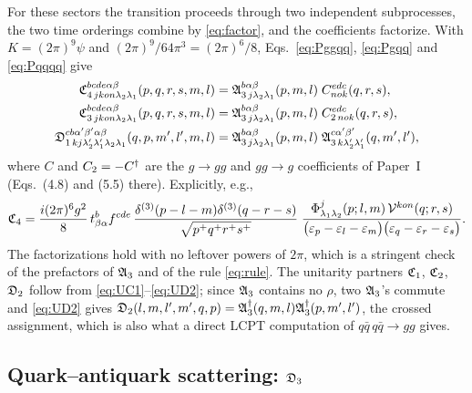 For these sectors the transition proceeds through two independent subprocesses, the two time
orderings combine by \eqref{eq:factor}, and the coefficients factorize. With
$K=(2\pi)^{9}\psi$ and $(2\pi)^{9}/64\pi^{3}=(2\pi)^{6}/8$, Eqs.~\eqref{eq:Pggqq}, \eqref{eq:Pgqq}
and \eqref{eq:Pqqqq} give
\begin{align}
\mathfrak{C}^{bcde\alpha\beta}_{4\,jkon\lambda_{2}\lambda_{1}}(p,q,r,s,m,l)&=
\mathfrak{A}^{b\alpha\beta}_{3\,j\lambda_{2}\lambda_{1}}(p,m,l)\;C^{edc}_{nok}(q,r,s),
\label{eq:C4}\\
\mathfrak{C}^{bcde\alpha\beta}_{3\,jkon\lambda_{2}\lambda_{1}}(p,q,r,s,m,l)&=
\mathfrak{A}^{b\alpha\beta}_{3\,j\lambda_{2}\lambda_{1}}(p,m,l)\;C^{edc}_{2\,nok}(q,r,s),
\label{eq:C3}\\
\mathfrak{D}^{cb\alpha'\beta'\alpha\beta}_{1\,kj\lambda_{2}'\lambda_{1}'\lambda_{2}\lambda_{1}}(q,p,m',l',m,l)&=
\mathfrak{A}^{b\alpha\beta}_{3\,j\lambda_{2}\lambda_{1}}(p,m,l)\;\mathfrak{A}^{c\alpha'\beta'}_{3\,k\lambda_{2}'\lambda_{1}'}(q,m',l'),
\label{eq:D1}
\end{align}
where $C$ and $C_{2}=-C^{\dagger}$ are the $g\to gg$ and $gg\to g$ coefficients of Paper~I
(Eqs.~(4.8) and (5.5) there). Explicitly, e.g.,
\begin{equation}
\mathfrak{C}_{4}=\frac{i(2\pi)^{6}g^{2}}{8}\,t^{b}_{\beta\alpha}f^{cde}\,
\frac{\delta^{(3)}(p-l-m)\delta^{(3)}(q-r-s)}{\sqrt{p^{+}q^{+}r^{+}s^{+}}}\;
\frac{\Phi^{j}_{\lambda_{1}\lambda_{2}}(p;l,m)\,\mathcal{V}^{kon}(q;r,s)}
{\big(\varepsilon_{p}-\varepsilon_{l}-\varepsilon_{m}\big)\big(\varepsilon_{q}-\varepsilon_{r}-\varepsilon_{s}\big)} .
\end{equation}
The factorizations hold with no leftover powers of $2\pi$, which is a stringent check of the
prefactors of $\mathfrak{A}_{3}$ and of the rule \eqref{eq:rule}. The unitarity partners
$\mathfrak{C}_{1}$, $\mathfrak{C}_{2}$, $\mathfrak{D}_{2}$ follow from \eqref{eq:UC1}--\eqref{eq:UD2}; since $\mathfrak{A}_{3}$ contains no
$\rho$, two $\mathfrak{A}_{3}$'s commute and \eqref{eq:UD2} gives
$\mathfrak{D}_{2}(l,m,l',m',q,p)=\mathfrak{A}^{\dagger}_{3}(q,m,l)\mathfrak{A}^{\dagger}_{3}(p,m',l')$, the crossed assignment, which is
also what a direct LCPT computation of $q\bar q\,q\bar q\to gg$ gives.

\subsection{Quark--antiquark scattering: $\mathfrak{D}_{3}$}

